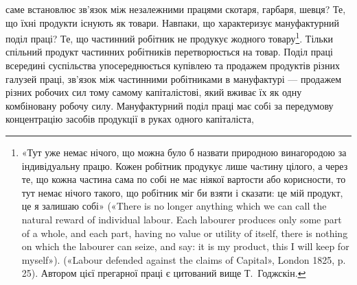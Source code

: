 саме встановлює зв’язок між незалежними працями скотаря,
гарбаря, шевця? Те, що їхні продукти існують як товари. Навпаки,
що характеризує мануфактурний поділ праці? Те, що
частинний робітник не продукує жодного товару\footnote{
«Тут уже немає нічого, що можна було б назвати природною винагородою
за індивідуальну працю. Кожен робітник продукує лише чаcтину
цілого, а через те, що кожна частина сама по собі не має ніякої
вартости або корисности, то тут немає нічого такого, що робітник міг би
взяти і сказати: це мій продукт, це я залишаю собі» («There is no longer
anything which we can call the natural reward of individual labour.
Each labourer produces only some part of a whole, and each part, having no
value or utility of itself, there is nothing on which the labourer can seize,
and say: it is my product, this I will keep for myself»). («Labour defended
against the claims of Capital», London 1825, p. 25). Автором цієї
прегарної праці є цитований вище Т.~Годжскін.
}. Тільки спільний
продукт частинних робітників перетворюється на товар. Поділ праці всередині суспільства упосереднюється купівлею та
продажем продуктів різних галузей праці, зв’язок між частинними
робітниками в мануфактурі — продажем різних робочих
сил тому самому капіталістові, який вживає їх як одну комбіновану
робочу силу. Мануфактурний поділ праці має собі за передумову
концентрацію засобів продукції в руках одного капіталіста,

